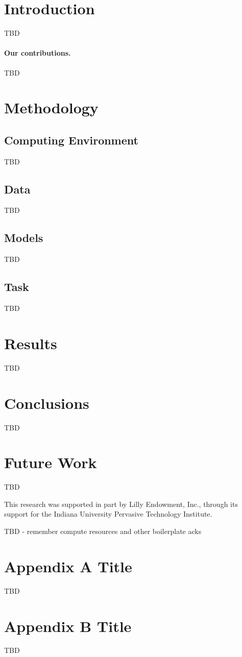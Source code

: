 \section{Introduction}
TBD

\paragraph{Our contributions.} TBD


\section{Methodology}

\subsection{Computing Environment}

TBD

\subsection{Data} 

TBD

\subsection{Models}

TBD

\subsection{Task}
TBD

\section{Results}

TBD


\section{Conclusions}

TBD

\section{Future Work}

TBD


\begin{acks}

This research was supported in part by Lilly Endowment, Inc., through its support for the Indiana University Pervasive Technology Institute. \cite{PTI} %

TBD - remember compute resources and other boilerplate acks

\end{acks}

\newpage
\appendix
\section{Appendix A Title} 

TBD


\section{Appendix B Title}

TBD



